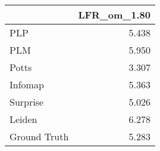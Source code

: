 \begin{tabular}{lr}
\toprule
{} & LFR_om_1.80 \\
\midrule
PLP          &       5.438 \\
PLM          &       5.950 \\
Potts        &       3.307 \\
Infomap      &       5.363 \\
Surprise     &       5.026 \\
Leiden       &       6.278 \\
Ground Truth &       5.283 \\
\bottomrule
\end{tabular}
